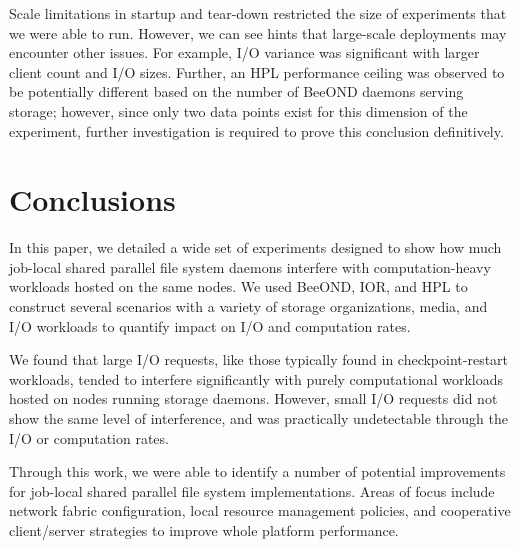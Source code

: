 \documentclass[conference]{IEEEtran}
\begin{document}
Scale limitations in startup and tear-down restricted the size of
experiments that we were able to run. However, we can see hints that
large-scale deployments may encounter other issues. For example, I/O
variance was significant with larger client count and I/O
sizes. Further, an HPL performance ceiling was observed to be
potentially different based on the number of BeeOND daemons serving
storage; however, since only two data points exist for this dimension
of the experiment, further investigation is required to prove this
conclusion definitively.

\section{Conclusions}

In this paper, we detailed a wide set of experiments designed to show
how much job-local shared parallel file system daemons interfere with
computation-heavy workloads hosted on the same nodes. We used BeeOND,
IOR, and HPL to construct several scenarios with a variety of storage
organizations, media, and I/O workloads to quantify impact on I/O and
computation rates.

We found that large I/O requests, like those typically found in
checkpoint-restart workloads, tended to interfere significantly with
purely computational workloads hosted on nodes running storage
daemons. However, small I/O requests did not show the same level of
interference, and was practically undetectable through the I/O or
computation rates.

Through this work, we were able to identify a number of potential
improvements for job-local shared parallel file system
implementations. Areas of focus include network fabric configuration,
local resource management policies, and cooperative client/server
strategies to improve whole platform performance.





%
%
%
\end{document}
